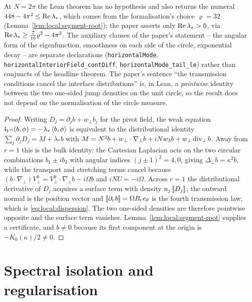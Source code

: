 At $N=2\pi$ the Lean theorem has no hypothesis and also returns the numeral
$448-4\pi^2\leq\operatorname{Re}\lambda_*$, which comes from the formalisation's choice $\varrho=32$
(Lemma~\ref{lem:local:segment-root}); the paper asserts only $\operatorname{Re}\lambda_*>0$, via
$\operatorname{Re}\lambda_*\geq\tfrac7{16}\varrho^2-4\pi^2$.  The auxiliary clauses of the paper's
statement -- the angular form of the eigenfunction, smoothness on each side of the circle,
exponential decay -- are separate declarations (\texttt{horizontalMode},
\texttt{horizontalInteriorField\_contDiff}, \texttt{horizontalMode\_tail\_le}) rather than
conjuncts of the headline theorem.  The paper's sentence ``the transmission conditions
cancel the interface distributions'' is, in Lean, a \emph{pointwise} identity between the
two one-sided jump densities on the unit circle, so the result does not depend on the
normalisation of the circle measure.

\begin{proof}
  \leanok
  Writing $D_j=\partial_jb+w_\perp b_j$ for the pivot field, the weak equation
  $\mathfrak l_{V^0}(b,\phi)=-\lambda_*\left\langle b,\phi\right\rangle$ is equivalent to the distributional
  identity $\sum_j\partial_jD_j=M+\lambda_*b$ with
  $M=N^2b+w_\perp\cdot\nabla_\perp b+iNw_3b+w_\perp\operatorname{div}_\perp b$.  Away from $r=1$ this is
  the bulk identity: the Cartesian Laplacian acts on the two circular combinations
  $b_1\pm ib_2$ with angular indices $(j\pm1)^2=4,0$, giving $\Delta_\perp b=\kappa^2b$,
  while the
  transport and stretching terms cancel because $(b\cdot\nabla_\perp)V^0_\perp
  =V^0_\perp\cdot\nabla_\perp b-i\Omega b$ and $iNU=-i\Omega$.  Across $r=1$ the
  distributional derivative of $D_j$ acquires a surface term with density
  $n_j\left[\![D_j\right]\!]$; the outward normal is the position vector and
  $\left[\![\partial_rb\right]\!]=\Omega B_re_\theta$ is the fourth transmission law, which is
  \eqref{eq:local:dispersion}.  The two one-sided densities are therefore pointwise
  opposite and the surface term vanishes.  Lemma~\ref{lem:local:segment-root} supplies a
  certificate, and $b\neq0$ because its first component at the origin is
  $-K_0(\kappa)/2\neq0$.
\end{proof}

\section{Spectral isolation and regularisation}

